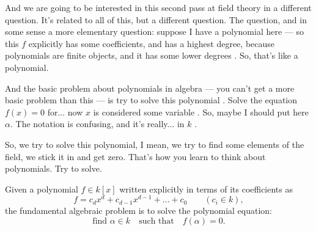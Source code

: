 \begin{speech}[00:48:29 - 00:49:35]
And we are going to be interested in this second pass at field theory in a different question. It's related to all of this, but a different question. The question, and in some sense a more elementary question: suppose I have a polynomial here --- so this $f$ explicitly has some coefficients, and has a highest degree, because polynomials are finite objects, and it has some lower degrees . So, that's like a polynomial.

And the basic problem about polynomials in algebra --- you can't get a more basic problem than this --- is try to solve this polynomial . Solve the equation $f(x) = 0$ for... now $x$ is considered some variable . So, maybe I should put here $\alpha$. The notation is confusing, and it's really... in $k$ .

So, we try to solve this polynomial, I mean, we try to find some elements of the field, we stick it in and get zero. That's how you learn to think about polynomials. Try to solve.
\end{speech}

\begin{content}
Given a polynomial $f \in k[x]$ written explicitly in terms of its coefficients as
\[
f = c_d x^d + c_{d-1} x^{d-1} + \dots + c_0 \qquad (c_i \in k),
\]
the fundamental algebraic problem is to solve the polynomial equation:
\[
\text{find } \alpha \in k \quad \text{such that} \quad f(\alpha) = 0.
\]
\end{content}

